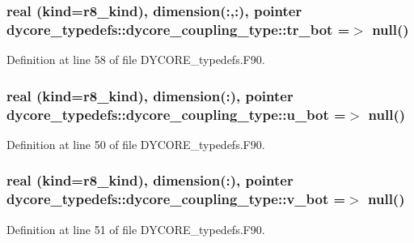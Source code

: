\subsubsection[{tr\-\_\-bot}]{\setlength{\rightskip}{0pt plus 5cm}real (kind=r8\-\_\-kind), dimension(\-:,\-:), pointer dycore\-\_\-typedefs\-::dycore\-\_\-coupling\-\_\-type\-::tr\-\_\-bot =$>$ null()}\label{structdycore__typedefs_1_1dycore__coupling__type_ac058ed0372a4f29cd443088d91bf5214}


Definition at line 58 of file D\-Y\-C\-O\-R\-E\-\_\-typedefs.\-F90.

\subsubsection[{u\-\_\-bot}]{\setlength{\rightskip}{0pt plus 5cm}real (kind=r8\-\_\-kind), dimension(\-:), pointer dycore\-\_\-typedefs\-::dycore\-\_\-coupling\-\_\-type\-::u\-\_\-bot =$>$ null()}\label{structdycore__typedefs_1_1dycore__coupling__type_a0f1e2c519ff3fb826527fc759f4dcf62}


Definition at line 50 of file D\-Y\-C\-O\-R\-E\-\_\-typedefs.\-F90.

\subsubsection[{v\-\_\-bot}]{\setlength{\rightskip}{0pt plus 5cm}real (kind=r8\-\_\-kind), dimension(\-:), pointer dycore\-\_\-typedefs\-::dycore\-\_\-coupling\-\_\-type\-::v\-\_\-bot =$>$ null()}\label{structdycore__typedefs_1_1dycore__coupling__type_a1cc41e534da5330112d86bee76a8f185}


Definition at line 51 of file D\-Y\-C\-O\-R\-E\-\_\-typedefs.\-F90.

